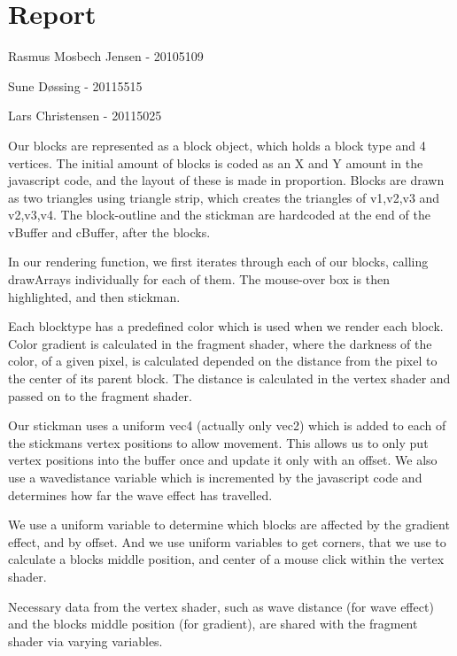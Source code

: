 \section{Report}

Rasmus Mosbech Jensen - 20105109

Sune D\o ssing - 20115515 

Lars Christensen - 20115025



Our blocks are represented as a block object, which holds a block type and 4 vertices.
The initial amount of blocks is coded as an X and Y amount in the javascript code,
and the layout of these is made in proportion.
Blocks are drawn as two triangles using triangle strip, which creates the triangles of v1,v2,v3 and v2,v3,v4.
The block-outline and the stickman are hardcoded at the end of the vBuffer and cBuffer, after the blocks.

In our rendering function, we first iterates through each of our blocks, calling drawArrays individually for each of them. The mouse-over box is then highlighted, and then stickman.



Each blocktype has a predefined color which is used when we render each block.
Color gradient is calculated in the fragment shader, where the darkness of the color, of a given pixel, is calculated depended on the distance from the pixel to the center of its parent block. The distance is calculated in the vertex shader and passed on to the fragment shader.



Our stickman uses a uniform vec4 (actually only vec2) which is added to each of the stickmans vertex positions to allow movement.
This allows us to only put vertex positions into the buffer once and update it only with an offset. 
We also use a wavedistance variable which is incremented by the javascript code and determines how far the wave effect has travelled.

We use a uniform variable to determine which blocks are affected by the gradient effect, and by offset.
And we use uniform variables to get corners, that we use to calculate a blocks middle position, and center of a mouse click within the vertex shader.

Necessary data from the vertex shader, such as wave distance (for wave effect) and the blocks middle position (for gradient), 
are shared with the fragment shader via varying variables.


